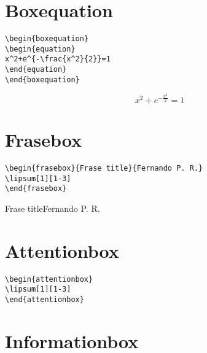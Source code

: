 
\section{Boxequation}

\begin{verbatim}
\begin{boxequation}
\begin{equation}
x^2+e^{-\frac{x^2}{2}}=1
\end{equation}
\end{boxequation}
\end{verbatim}
\begin{boxequation}
\begin{equation}
x^2+e^{-\frac{x^2}{2}}=1
\end{equation}
\end{boxequation}


\section{Frasebox}

\begin{verbatim}
\begin{frasebox}{Frase title}{Fernando P. R.}
\lipsum[1][1-3]
\end{frasebox}
\end{verbatim}
\begin{frasebox}{Frase title}{Fernando P. R.}
\lipsum[1][1-3]
\end{frasebox}

\section{Attentionbox}

\lipsum[1][1-3]

\begin{verbatim}
\begin{attentionbox}
\lipsum[1][1-3] 
\end{attentionbox}
\end{verbatim}
\begin{attentionbox}
\lipsum[1][1-3] 
\end{attentionbox}



\section{Informationbox}

